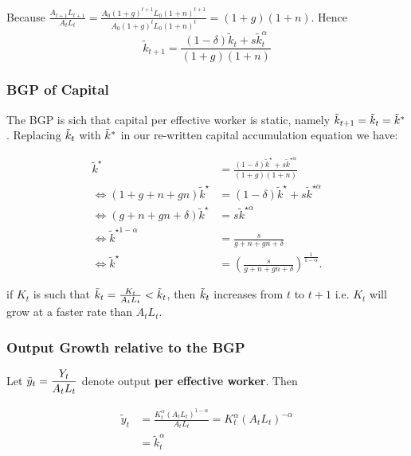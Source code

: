 \documentclass[11pt]{article}
\begin{document}
Because $\frac{A_{t+1} L_{t+1}}{A_t L_t}=\frac{A_0(1+g)^{t+1} L_0(1+n)^{t+1}}{A_0(1+g)^t L_0(1+n)^t}=(1+g)(1+n)$. Hence
\begin{equation}
\tilde{k}_{t+1}=\frac{(1-\delta) \tilde{k}_t+s \tilde{k}_t^\alpha}{(1+g)(1+n)}
\end{equation}

\subsubsection{BGP of Capital}

The BGP is sich that capital per effective worker is static, namely $\Tilde{k}_{t+1} = \Tilde{k}_t = \Tilde{k}^*$. Replacing $\Tilde{k}_t$ with $\Tilde{k}^*$ in our re-written capital accumulation equation we have:

\begin{equation}
\begin{aligned}
\tilde{k}^{\star} & =\frac{(1-\delta) \tilde{k}^{\star}+s \tilde{k}^{\star \alpha}}{(1+g)(1+n)} \\
\Leftrightarrow(1+g+n+g n) \tilde{k}^{\star} & =(1-\delta) \tilde{k}^{\star}+s \tilde{k}^{\star \alpha} \\
\Leftrightarrow(g+n+g n+\delta) \tilde{k}^{\star} & =s \tilde{k}^{\star \alpha} \\
\Leftrightarrow \tilde{k}^{\star 1-\alpha} & =\frac{s}{g+n+g n+\delta} \\
\Leftrightarrow \tilde{k}^{\star} & =\left(\frac{s}{g+n+g n+\delta}\right)^{\frac{1}{1-\alpha}} .
\end{aligned}
\end{equation}

\begin{shaded}
    if $K_t$ is such that $\Tilde{k}_t = \frac{K_t}{A_tL_t} < \Tilde{k}_t$, then $\Tilde{k}_t$ increases from $t$ to $t+1$ i.e. $K_t$ will grow at a faster rate than $A_tL_t$.
\end{shaded}

\subsubsection{Output Growth relative to the BGP}

Let $\Tilde{y}_t = \dfrac{Y_t}{A_tL_t}$ denote output \textbf{per effective worker}. Then

\begin{equation}
\begin{aligned}
\tilde{y}_t & =\frac{K_t^\alpha\left(A_t L_t\right)^{1-\alpha}}{A_t L_t}=K_t^\alpha\left(A_t L_t\right)^{-\alpha} \\
& =\tilde{k}_t^\alpha
\end{aligned}
\end{equation}
\end{document}

